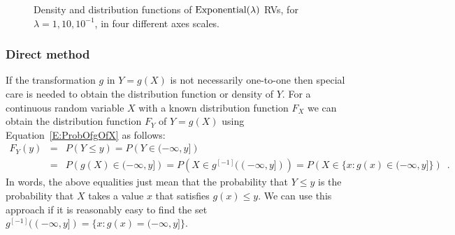 
\begin{figure}[htpb]
\caption{Density and distribution functions of $\mbox{{\rm Exponential}}(\lambda)$ RVs, for $\lambda=1, 10, 10^{-1}$, in four different axes scales.\label{F:plotPdfCdfExponentials}}
\centering   {}
\end{figure}


\subsubsection{Direct method}\label{S:DirectMethod}
If the transformation $g$ in $Y=g(X)$ is not necessarily one-to-one then special care is needed to obtain the distribution function or density of $Y$.  
For a continuous random variable $X$ with a known distribution function $F_X$ we can obtain the distribution function $F_Y$ of $Y=g(X)$ using Equation~\eqref{E:ProbOfgOfX} as follows:
\begin{eqnarray*}
F_Y(y)
&=& P \left(Y \leq y \right) = P \left(Y \in (-\infty, y] \right)\\
&=& P \left( g(X) \in (-\infty, y] \right) = P \left( X \in g^{[-1]}((-\infty, y]) \right) = P \left(X \in \{x: g(x) \in (-\infty,y]\}  \right) \enspace . %
\end{eqnarray*}
In words, the above equalities just mean that the probability that $Y \leq y$ is the probability that $X$ takes a value $x$ that satisfies $g(x) \leq y$.  
We can use this approach if it is reasonably easy to find the set $g^{[-1]}((-\infty,y]) = \{x: g(x) = (-\infty,y]\}$.%

